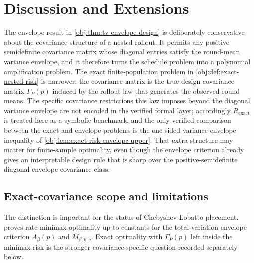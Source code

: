 \documentclass[11pt]{article}
\begin{document}
\section{Discussion and Extensions}

The envelope result in \cref{obj:thm:tv-envelope-design} is deliberately conservative about the covariance structure of a nested rollout. It permits any positive semidefinite covariance matrix whose diagonal entries satisfy the round-mean variance envelope, and it therefore turns the schedule problem into a polynomial amplification problem. The exact finite-population problem in \cref{obj:def:exact-nested-risk} is narrower: the covariance matrix is the true design covariance matrix \(\Gamma_P(p)\) induced by the rollout law that generates the observed round means. The specific covariance restrictions this law imposes beyond the diagonal variance envelope are not encoded in the verified formal layer; accordingly \(R_{\mathrm{exact}}\) is treated here as a symbolic benchmark, and the only verified comparison between the exact and envelope problems is the one-sided variance-envelope inequality of \cref{obj:lem:exact-risk-envelope-upper}. That extra structure may matter for finite-sample optimality, even though the envelope criterion already gives an interpretable design rule that is sharp over the positive-semidefinite diagonal-envelope covariance class.

\subsection{Exact-covariance scope and limitations}

The distinction is important for the status of Chebyshev-Lobatto placement.  proves rate-minimax optimality up to constants for the total-variation envelope criterion \(A_\beta(p)\) and \(M_{\beta,k,q}\). Exact optimality with \(\Gamma_P(p)\) left inside the minimax risk is the stronger covariance-specific question recorded separately below.
\end{document}
